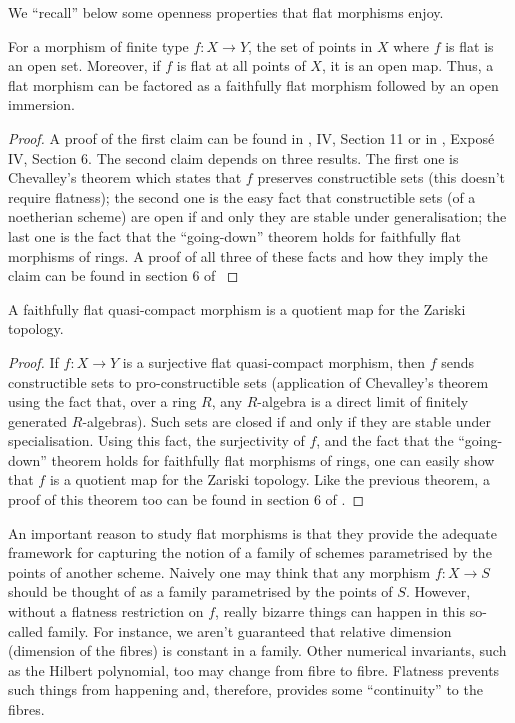 \noindent
We ``recall'' below some openness properties that flat morphisms enjoy.

\begin{theorem}
\label{theorem-flat-open}
For a morphism of finite type $f : X \to Y$, the set of points in $X$ where $f$
is flat is an open set. Moreover, if $f$ is flat at all points of $X$, it is
an open map. Thus, a flat morphism can be factored as a faithfully flat
morphism followed by an open immersion.
\end{theorem}

\begin{proof}
A proof of the first claim can be found in \cite{EGA}, IV, Section 11 or in
\cite{SGA1}, Expos\'e IV, Section 6. The second claim depends on three
results. The first one is Chevalley's theorem which states that $f$ preserves
constructible sets (this doesn't require flatness); the second one is the
easy fact that constructible sets (of a noetherian scheme) are open if and
only they are stable under generalisation; the last one is the fact that the
``going-down'' theorem holds for faithfully flat morphisms of rings. A proof
of all three of these facts and how they imply the claim can be found in
section 6 of \cite{MatCA}
\end{proof}

\begin{theorem}
\label{theorem-flat-is-quotient}
A faithfully flat quasi-compact morphism is a quotient map for
the Zariski topology.
\end{theorem}

\begin{proof}
If $f : X \to Y$ is a surjective flat quasi-compact morphism, then $f$ sends
constructible sets to pro-constructible sets (application of Chevalley's
theorem using the fact that, over a ring $R$, any $R$-algebra is a direct
limit of finitely generated $R$-algebras). Such sets are closed if and only
if they are stable under specialisation. Using this fact, the surjectivity
of $f$, and the fact that the ``going-down'' theorem holds for faithfully
flat morphisms of rings, one can easily show that $f$ is a quotient map for
the Zariski topology. Like the previous theorem, a proof of this theorem too
can be found in section 6 of \cite{MatCA}.
\end{proof}

\noindent
An important reason to study flat morphisms is that they provide the adequate
framework for capturing the notion of a family of schemes parametrised by the
points of another scheme. Naively one may think that any morphism $f : X \to S$
should be thought of as a family parametrised by the points of $S$. However,
without a flatness restriction on $f$, really bizarre things can happen in
this so-called family. For instance, we aren't guaranteed that relative
dimension (dimension of the fibres) is constant in a family. Other numerical
invariants, such as the Hilbert polynomial, too may change from fibre to
fibre. Flatness prevents such things from happening and, therefore, provides
some ``continuity'' to the fibres.

